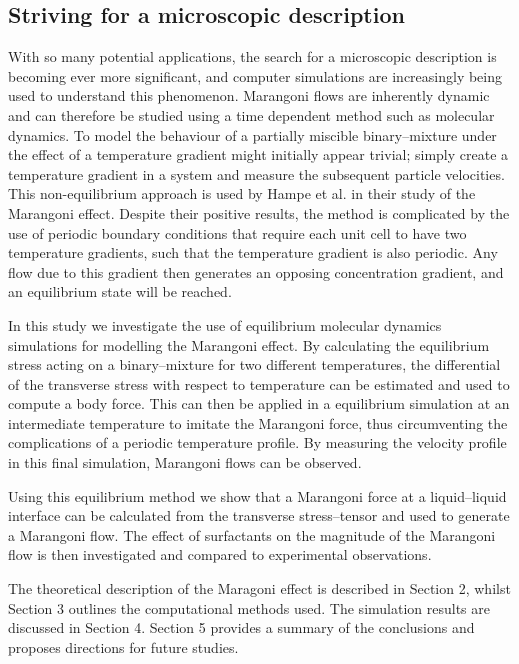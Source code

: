 \subsection{Striving for a microscopic description}
With so many potential applications, the search for a microscopic description is becoming ever more significant, and computer simulations are increasingly being used to understand this phenomenon.
Marangoni flows are inherently dynamic and can therefore be studied using a time dependent method such as molecular dynamics.
To model the behaviour of a partially miscible binary--mixture under the effect of a temperature gradient might initially appear trivial; simply create a temperature gradient in a system and measure the subsequent particle velocities.
This non-equilibrium approach is used by Hampe et al. in their study of the Marangoni effect.\cite{HolgerBoppHampe}
Despite their positive results, the method is complicated by the use of periodic boundary conditions that require each unit cell to have two temperature gradients, such that the temperature gradient is also periodic.
Any flow due to this gradient then generates an opposing concentration gradient, and an equilibrium state will be reached.

In this study we investigate the use of equilibrium molecular dynamics simulations for modelling the Marangoni effect.
By calculating the equilibrium stress acting on a binary--mixture for two different temperatures, the differential of the transverse stress with respect to temperature can be estimated and used to compute a body force.
This can then be applied in a equilibrium simulation at an intermediate temperature to imitate the Marangoni force, thus circumventing the complications of a periodic temperature profile.
By measuring the velocity profile in this final simulation, Marangoni flows can be observed.

Using this equilibrium method we show that a Marangoni force at a liquid--liquid interface can be calculated from the transverse stress--tensor and used to generate a Marangoni flow.
The effect of surfactants on the magnitude of the Marangoni flow is then investigated and compared to experimental observations.

The theoretical description of the Maragoni effect is described in Section 2, whilst Section 3 outlines the computational methods used.
The simulation results are discussed in Section 4.
Section 5 provides a summary of the conclusions and proposes directions for future studies.
